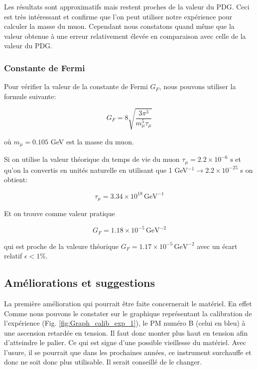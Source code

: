 \documentclass[12pt]{article}
\begin{document}
Les résultats sont approximatifs mais restent proches de la valeur du PDG. Ceci est très intéressant et confirme que l'on peut utiliser notre expérience pour calculer la masse du muon. Cependant nous constatons quand même que la valeur obtenue à une erreur relativement élevée en comparaison avec celle de la valeur du PDG. 

\subsubsection{Constante de Fermi}

Pour vérifier la valeur de la constante de Fermi $G_{F}$, nous pouvons utiliser la formule suivante:

\[ G_{F} =8\sqrt{\frac{3\pi^{3}}{m_{\mu}^{5}\tau_{\mu}}} \]

où $m_{\mu}=0.105$ GeV est la masse du muon.

Si on utilise la valeur théorique du temps de vie du muon $\tau_{\mu}=2.2\times10^{-6} \text{ s}$ et qu'on la convertis en unités naturelle en utilisant que 1 GeV$^{-1}\rightarrow2.2\times10^{-25}$ s on obtient:

\[ \tau_{\mu}=3.34\times10^{18}\,\text{GeV}^{-1}\]

Et on trouve comme valeur pratique

\[ G_{F}=1.18\times10^{-5}\,\text{GeV}^{-2}\]

qui est proche de la valeure théorique $G_{F}=1.17\times10^{-5}\,\text{GeV}^{-2}$ avec un écart relatif $\epsilon<1\%$.

\subsection{Améliorations et suggestions}

La première amélioration qui pourrait être faite concernerait le matériel. En effet Comme nous pouvons le constater sur le graphique représentant la calibration de l'expérience (Fig. \ref{fig:Graph_calib_exp_1}), le PM numéro B (celui en bleu) à une ascension retardée en tension. Il faut donc monter plus haut en tension afin d'atteindre le palier. Ce qui est signe d'une possible vieillesse du matériel. Avec l'usure, il se pourrait que dans les prochaines années, ce instrument surchauffe et donc ne soit donc plus utilisable. Il serait conseillé de le changer. 
\end{document}
